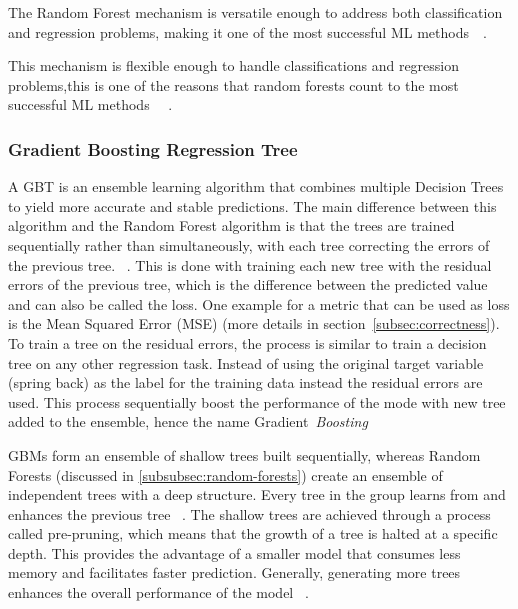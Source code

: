 {The Random Forest mechanism is versatile enough to address both classification and regression problems, making it one
of the most successful
\ac{ML} methods~\cite[p. 3--4]{biau_randomforestguided_2016}~\cite[p. 25]{breiman_randomforests_2001}.

This mechanism is flexible enough to handle classifications and regression problems,this is one of the reasons that
random forests count to the most successful \ac{ML}
methods
~\cite[p. 3--4]{biau_randomforestguided_2016}~\cite[p. 25]{breiman_randomforests_2001}.


\subsubsection{Gradient Boosting Regression Tree}

A \ac{GBT} is an ensemble learning algorithm that combines multiple Decision Trees
to yield more accurate and stable predictions.
The main difference between this algorithm and the Random Forest algorithm is that the trees are trained sequentially
rather than simultaneously, with each tree correcting the errors of the previous tree.
~\cite[p. 88--89]{muller_introductionmachinelearning_2016}.
This is done with training each new tree with the residual errors of the previous tree, which is the
difference between the predicted value and can also be called the loss.
One example for a metric that can be used as loss is the Mean Squared Error (MSE) (more details in
section~\ref{subsec:correctness}).
To train a tree on the residual errors, the process is similar to train a decision tree on any other regression
task.
Instead of using the original target variable (spring back) as the label for the training data instead the
residual errors are used.
This process sequentially boost the performance of the mode with new tree added to the
ensemble, hence the name Gradient~\textit{Boosting}
~\cite[p. 222]{boehmke2019hands}

GBMs form an ensemble of shallow trees built sequentially, whereas Random Forests (discussed in
\cref{subsubsec:random-forests}) create an ensemble of independent trees with a deep structure.
Every tree in the group learns from and enhances the previous tree
~\cite[p. 221]{boehmke2019hands}.
The shallow trees are achieved through a process called pre-pruning, which means that the growth of a tree is halted
at a specific depth.
This provides the advantage of a smaller model that consumes less memory and facilitates faster prediction.
Generally, generating more trees enhances the overall performance of the
model
~\cite[pp. 74, 88--89]{muller_introductionmachinelearning_2016}.

}

